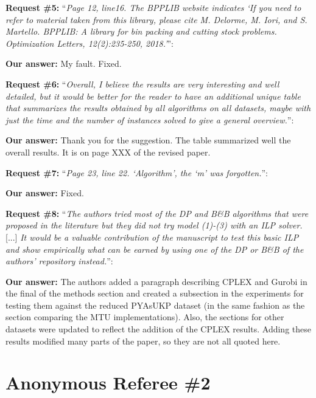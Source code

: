 \documentclass{elsarticle}
\begin{document}
\textbf{Request \#5:} ``\textit{Page 12, line16. The BPPLIB website indicates `If you need to refer to material taken from this library, please cite M. Delorme, M. Iori, and S. Martello. BPPLIB: A library for bin packing and cutting stock problems. Optimization Letters, 12(2):235-250, 2018.'}'':

\textbf{Our answer:} My fault. Fixed.
\medskip

\textbf{Request \#6:} ``\textit{Overall, I believe the results are very interesting and well detailed, but it would be better for the reader to have an additional unique table that summarizes the results obtained by all algorithms on all datasets, maybe with just the time and the number of instances solved to give a general overview.}'':

\textbf{Our answer:} Thank you for the suggestion. The table summarized well the overall results. It is on page XXX of the revised paper.
\medskip

\textbf{Request \#7:} ``\textit{Page 23, line 22. `Algorithm', the `m' was forgotten.}'':

\textbf{Our answer:} Fixed.
\medskip

\textbf{Request \#8:} ``\textit{The authors tried most of the DP and B\&B algorithms that were proposed in the literature but they did not try model (1)-(3) with an ILP solver.} [...] \textit{It would be a valuable contribution of the manuscript to test this basic ILP and show empirically what can be earned by using one of the DP or B\&B of the authors' repository instead.}'':

\textbf{Our answer:} The authors added a paragraph describing CPLEX and Gurobi in the final of the methods section and created a subsection in the experiments for testing them against the reduced PYAsUKP dataset (in the same fashion as the section comparing the MTU implementations). Also, the sections for other datasets were updated to reflect the addition of the CPLEX results. Adding these results modified many parts of the paper, so they are not all quoted here.
\medskip

\section{Anonymous Referee \#2}
\end{document}
